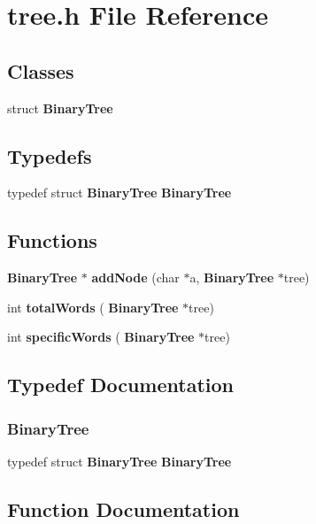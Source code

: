 \section{tree.\+h File Reference}
\label{tree_8h}
\subsection*{Classes}
\begin{DoxyCompactItemize}
\item 
struct \textbf{ Binary\+Tree}
\end{DoxyCompactItemize}
\subsection*{Typedefs}
\begin{DoxyCompactItemize}
\item 
typedef struct \textbf{ Binary\+Tree} \textbf{ Binary\+Tree}
\end{DoxyCompactItemize}
\subsection*{Functions}
\begin{DoxyCompactItemize}
\item 
\textbf{ Binary\+Tree} $\ast$ \textbf{ add\+Node} (char $\ast$a, \textbf{ Binary\+Tree} $\ast$tree)
\item 
int \textbf{ total\+Words} (\textbf{ Binary\+Tree} $\ast$tree)
\item 
int \textbf{ specific\+Words} (\textbf{ Binary\+Tree} $\ast$tree)
\end{DoxyCompactItemize}


\subsection{Typedef Documentation}
\mbox{\label{tree_8h_ad06777af06d193b303b9d45a5b13144f}} 
\subsubsection{Binary\+Tree}
{\footnotesize\ttfamily typedef struct \textbf{ Binary\+Tree} \textbf{ Binary\+Tree}}



\subsection{Function Documentation}
\mbox{\label{tree_8h_a4bd69b66d4a265ef2aa739944c317c37}} 
